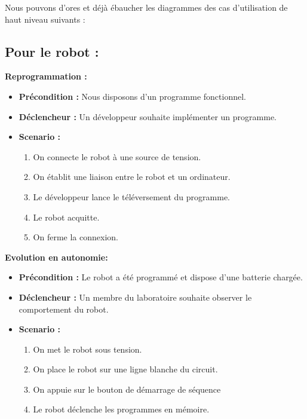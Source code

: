 Nous pouvons d'ores et déjà ébaucher les diagrammes des cas d'utilisation de haut niveau suivants :

\subsection{Pour le robot :}


	\textbf{Reprogrammation :}
	\begin{itemize}
		\item \textbf{Précondition :} Nous disposons d'un programme fonctionnel.
		\item \textbf{Déclencheur :} Un développeur souhaite implémenter un programme.
		\item \textbf{Scenario :}
		\begin{enumerate}
			\item On connecte le robot à une source de tension.
			\item On établit une liaison entre le robot et un ordinateur.
			\item Le développeur lance le téléversement du programme.
			\item Le robot acquitte.
			\item On ferme la connexion.
		\end{enumerate}
	\end{itemize}

	\textbf{Evolution en autonomie:}
	\begin{itemize}
		\item \textbf{Précondition :} Le robot a été programmé et dispose d'une batterie chargée.
		\item \textbf{Déclencheur :} Un membre du laboratoire souhaite observer le comportement du robot.
		\item \textbf{Scenario :}
		\begin{enumerate}
			\item On met le robot sous tension.
			\item On place le robot sur une ligne blanche du circuit.
			\item On appuie sur le bouton de démarrage de séquence
			\item Le robot déclenche les programmes en mémoire.
		\end{enumerate}
	\end{itemize}

